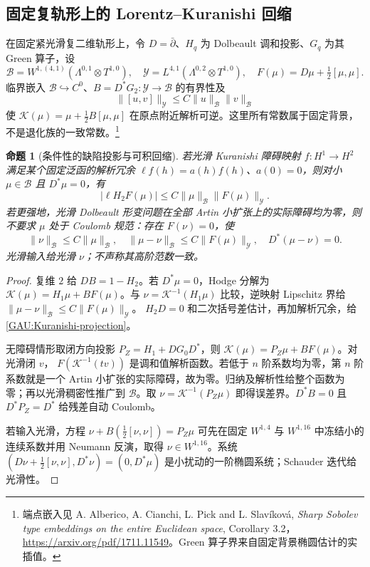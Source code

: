 \documentclass[UTF8,fontset=fandol,zihao=-4,oneside,openany]{ctexbook}
\theoremstyle{cjkplain}
\newtheorem{proposition}[theorem]{命题}
\numberwithin{equation}{chapter}
\begin{document}
\subsection{固定复轨形上的 Lorentz--Kuranishi 回缩}
在固定紧光滑复二维轨形上，令 $D=\bar\partial$、$H_q$ 为 Dolbeault 调和投影、$G_q$ 为其 Green 算子，设
\[
\mathcal B=W^{1,(4,1)}(\Lambda^{0,1}\otimes T^{1,0}),\quad
\mathcal Y=L^{4,1}(\Lambda^{0,2}\otimes T^{1,0}),\quad
F(\mu)=D\mu+\tfrac12[\mu,\mu].
\]
临界嵌入 $\mathcal B\hookrightarrow C^0$、$B=D^*G_2:\mathcal Y\to\mathcal B$ 的有界性及
\[
\|[u,v]\|_{\mathcal Y}\le C\|u\|_{\mathcal B}\|v\|_{\mathcal B}
\]
使 $\mathcal K(\mu)=\mu+\frac12B[\mu,\mu]$ 在原点附近解析可逆。这里所有常数属于固定背景，不是退化族的一致常数。\footnote{端点嵌入见 A. Alberico, A. Cianchi, L. Pick and L. Slavíková, \emph{Sharp Sobolev type embeddings on the entire Euclidean space}, Corollary 3.2，\url{https://arxiv.org/pdf/1711.11549}。Green 算子界来自固定背景椭圆估计的实插值。}

\begin{proposition}[条件性的缺陷投影与可积回缩]\label{GAU:Kuranishi}
若光滑 Kuranishi 障碍映射 $f:H^1\to H^2$ 满足某个固定泛函的解析冗余
$\ell f(h)=a(h)f(h)$、$a(0)=0$，则对小 $\mu\in\mathcal B$ 且 $D^*\mu=0$，有
\begin{equation}\label{GAU:Kuranishi-projection}
|\ell H_2F(\mu)|\le C\|\mu\|_{\mathcal B}\|F(\mu)\|_{\mathcal Y}.
\end{equation}
若更强地，光滑 Dolbeault 形变问题在全部 Artin 小扩张上的实际障碍均为零，则不要求 $\mu$ 处于 Coulomb 规范：存在 $F(\nu)=0$，使
\begin{equation}\label{GAU:retraction}
\|\nu\|_{\mathcal B}\le C\|\mu\|_{\mathcal B},\quad
\|\mu-\nu\|_{\mathcal B}\le C\|F(\mu)\|_{\mathcal Y},\quad
D^*(\mu-\nu)=0.
\end{equation}
光滑输入给光滑 $\nu$；不声称其高阶范数一致。
\end{proposition}
\begin{proof}
复维 $2$ 给 $DB=1-H_2$。若 $D^*\mu=0$，Hodge 分解为
$\mathcal K(\mu)=H_1\mu+B F(\mu)$。与
$\nu=\mathcal K^{-1}(H_1\mu)$ 比较，逆映射 Lipschitz 界给
$\|\mu-\nu\|_{\mathcal B}\le C\|F(\mu)\|_{\mathcal Y}$。
$H_2D=0$ 和二次括号差估计，再加解析冗余，给 \eqref{GAU:Kuranishi-projection}。

无障碍情形取闭方向投影
$P_Z=H_1+DG_0D^*$，则
$\mathcal K(\mu)=P_Z\mu+BF(\mu)$。对光滑闭 $v$，
$F(\mathcal K^{-1}(tv))$ 是调和值解析函数。若低于 $n$ 阶系数均为零，第 $n$ 阶系数就是一个 Artin 小扩张的实际障碍，故为零。归纳及解析性给整个函数为零；再以光滑稠密性推广到 $\mathcal B$。取 $\nu=\mathcal K^{-1}(P_Z\mu)$ 即得误差界。$D^*B=0$ 且 $D^*P_Z=D^*$ 给残差自动 Coulomb。

若输入光滑，方程 $\nu+B(\frac12[\nu,\nu])=P_Z\mu$ 可先在固定 $W^{1,4}$ 与 $W^{1,16}$ 中冻结小的连续系数并用 Neumann 反演，取得 $\nu\in W^{1,16}$。系统 $(D\nu+\frac12[\nu,\nu],D^*\nu)=(0,D^*\mu)$ 是小扰动的一阶椭圆系统；Schauder 迭代给光滑性。
\end{proof}
\end{document}
